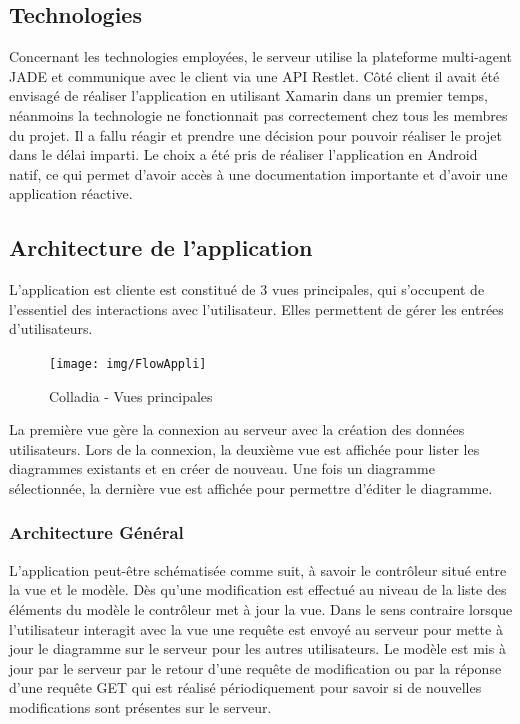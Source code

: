 \subsection{Technologies}
Concernant les technologies employées, le serveur utilise la plateforme multi-agent JADE et communique avec le client via une API Restlet.
Côté client il avait été envisagé de réaliser l'application en utilisant Xamarin dans un premier temps, néanmoins la technologie ne fonctionnait pas correctement chez tous les membres du projet.
Il a fallu réagir et prendre une décision pour pouvoir réaliser le projet dans le délai imparti.
Le choix a été pris de réaliser l'application en Android natif, ce qui permet d'avoir accès à une documentation importante et d'avoir une application réactive.

\subsection{Architecture de l'application}
L'application est cliente est constitué de 3 vues principales, qui s'occupent de l'essentiel des interactions avec l'utilisateur.
Elles permettent de gérer les entrées d'utilisateurs.
	
	\vspace*{\fill}
	\begin{figure}[!h]
		\centering
		\texttt{[image: img/FlowAppli]}
		\caption{Colladia - Vues principales}
	\end{figure}
	\vspace*{\fill}
	
La première vue gère la connexion au serveur avec la création des données utilisateurs. Lors de la connexion, la deuxième vue est affichée pour lister les diagrammes existants et en créer de nouveau.
Une fois un diagramme sélectionnée, la dernière vue est affichée pour permettre d'éditer le diagramme. 

\subsubsection{Architecture Général}
L'application peut-être schématisée comme suit, à savoir le contrôleur situé entre la vue et le modèle. Dès qu'une modification est effectué au niveau de la liste des éléments du modèle le contrôleur met à jour la vue.
Dans le sens contraire lorsque l'utilisateur interagit avec la vue une requête est envoyé au serveur pour mette à jour le diagramme sur le serveur pour les autres utilisateurs.
Le modèle est mis à jour par le serveur par le retour d'une requête de modification ou par la réponse d'une requête GET qui est réalisé périodiquement pour savoir si de nouvelles modifications sont présentes sur le serveur. 

